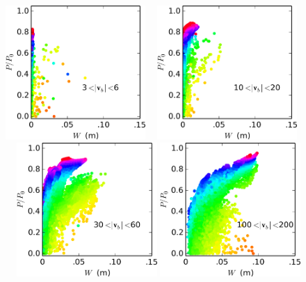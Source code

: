 \documentclass[gmd]{copernicus}   %
\begin{document}
\newcommand{\myheight}{2.0in}
\begin{figure}[ht]
\mbox{\includegraphics[height=\myheight,keepaspectratio=true]{bin1-g2km} \, \includegraphics[height=\myheight,keepaspectratio=true]{bin10-g2km} \, \includegraphics[height=\myheight,keepaspectratio=true]{bin30-g2km}}
\mbox{\includegraphics[height=\myheight,keepaspectratio=true]{bin100-g2km} \,
\includ}
\end{figure}
\end{document}
